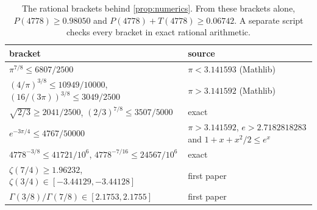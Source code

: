 \documentclass[11pt]{article}
\theoremstyle{definition}
\begin{document}
{\begin{table}[h]
\centering\small
\begin{tabular}{>{\raggedright\arraybackslash}p{7.4cm}>{\raggedright\arraybackslash}p{6.4cm}}
\toprule
bracket & source\\
\midrule
$\pi^{7/8} \le 6807/2500$ & $\pi < 3.141593$ (Mathlib)\\
$(4/\pi)^{3/8} \le 10949/10000$, $(16/(3\pi))^{3/8} \le 3049/2500$ & $\pi > 3.141592$ (Mathlib)\\
$\sqrt{2/3} \ge 2041/2500$, $(2/3)^{7/8} \le 3507/5000$ & exact\\
$e^{-3\pi/4} \le 4767/50000$ & $\pi > 3.141592$, $e > 2.7182818283$ and $1 + x + x^2/2 \le e^x$\\
$4778^{-3/8} \le 41721/10^6$, $4778^{-7/16} \le 24567/10^6$ & exact\\
$\zeta(7/4) \ge 1.96232$, $\zeta(3/4) \in [-3.44129, -3.44128]$ & first paper\\
$\Gamma(3/8)/\Gamma(7/8) \in [2.1753, 2.1755]$ & first paper\\
\bottomrule
\end{tabular}
\caption{The rational brackets behind \cref{prop:numerics}. From these brackets alone, $P(4778) \ge 0.98050$ and $P(4778) + T(4778) \ge 0.06742$. A separate script checks every bracket in exact rational arithmetic.}
\label{tab:brackets}
\end{table}

}
\end{document}
